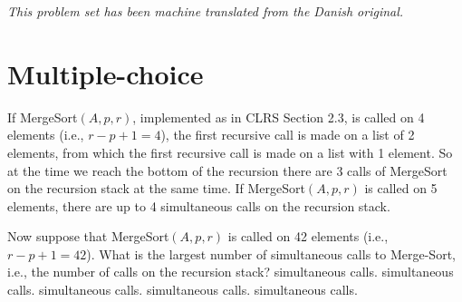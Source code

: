 \noindent\emph{This problem set has been machine translated from the Danish original.}
\medskip

\section*{Multiple-choice}\label{sec:mc}


\multiplechoicestart

If {\sc MergeSort}$(A,p,r)$, implemented as in CLRS Section 2.3,
is called on 4 elements (i.e., $r-p+1 = 4$), the first recursive call is made on a list of 2 elements, from which the first recursive call is made on a list with 1 element. So at the time we reach the bottom of the recursion there are 3 calls of {\sc MergeSort} on the recursion stack at the same time.
If {\sc MergeSort}$(A,p,r)$ is called on 5 elements, there are up to 4 simultaneous calls on the recursion stack.

\medskip

Now suppose that {\sc MergeSort}$(A,p,r)$ is called on 42 elements (i.e., $r-p+1 = 42$).
What is the largest number of simultaneous calls to {\sc Merge-Sort}, i.e., the number of calls on the recursion stack?
\oneanswer
\optionsstart
{} simultaneous calls.
 simultaneous calls.
 simultaneous calls.
 simultaneous calls.
 simultaneous calls. \correct
\optionsend
{}


